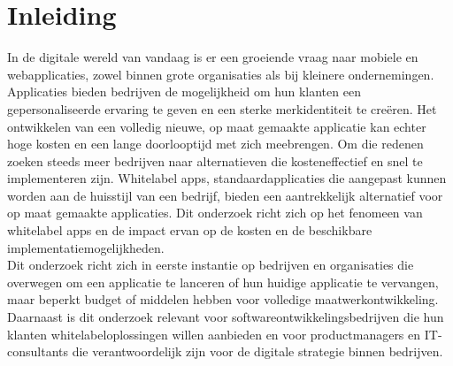 


% 

\section{Inleiding}%
\label{sec:inleiding}

In de digitale wereld van vandaag is er een groeiende vraag naar mobiele en webapplicaties, zowel binnen grote organisaties als bij kleinere ondernemingen.
Applicaties bieden bedrijven de mogelijkheid om hun klanten een gepersonaliseerde ervaring te geven en een sterke merkidentiteit te creëren. 
Het ontwikkelen van een volledig nieuwe, op maat gemaakte applicatie kan echter hoge kosten en een lange doorlooptijd met zich meebrengen. 
Om die redenen zoeken steeds meer bedrijven naar alternatieven die kosteneffectief en snel te implementeren zijn.
Whitelabel apps, standaardapplicaties die aangepast kunnen worden aan de huisstijl van een bedrijf, bieden een aantrekkelijk alternatief voor op maat gemaakte applicaties. 
Dit onderzoek richt zich op het fenomeen van whitelabel apps en de impact ervan op de kosten en de beschikbare implementatiemogelijkheden.\\

Dit onderzoek richt zich in eerste instantie op bedrijven en organisaties die overwegen om een applicatie te lanceren of hun huidige applicatie te vervangen, maar beperkt budget of middelen hebben voor volledige maatwerkontwikkeling.\\
Daarnaast is dit onderzoek relevant voor softwareontwikkelingsbedrijven die hun klanten whitelabeloplossingen willen aanbieden en voor productmanagers en IT-consultants die verantwoordelijk zijn voor de digitale strategie binnen bedrijven.\\

